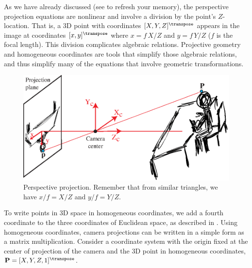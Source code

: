 As we have already discussed (see \fig{\ref{fig:pinholeGeometry2bis}} to refresh your memory), the perspective projection equations are nonlinear and involve a division by the point's $Z$-location. That is, a 3D point with coordinates $[X,Y,Z]^\transpose$ appears in the image at coordinates $[x,y]^\transpose$ where $x=f \, X/Z$ and $y=f\, Y/Z$ ($f$ is the focal length). This division complicates algebraic relations. Projective geometry and homogeneous coordinates are tools that simplify those algebraic relations, and thus simplify many of the equations that involve geometric transformations.



\begin{figure}[h]
\centerline{
\includegraphics[width=0.8\linewidth]{figures/imaging_geometry/camera_centric.eps}
}
\caption{Perspective projection. Remember that from similar triangles, we have $x/f = X/Z$ and $y/f = Y/Z$.}
\label{fig:pinholeGeometry2bis}
\end{figure}



To write points in 3D space in homogeneous coordinates, we add a fourth coordinate to the three coordinates of Euclidean space, as described in \chap{\ref{chapter:geometry_homogeneous}}.
Using homogeneous coordinates, camera projections can be written in a simple form as a matrix multiplication.  Consider a coordinate system with the origin fixed at the center of projection of the camera and the 3D point in homogeneous coordinates, $\mathbf{P}=[X, Y, Z, 1]^\transpose$.

